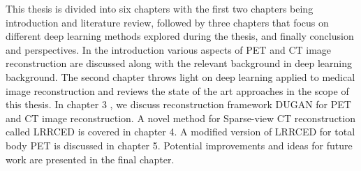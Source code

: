This thesis is divided into six chapters with the first two chapters being introduction and literature review, followed by three chapters that focus on different deep learning methods explored during the thesis, and finally conclusion and perspectives. In the introduction various aspects of \ac{PET} and \ac{CT} image reconstruction are discussed along with the relevant background in deep learning background. The second chapter throws light on deep learning applied to medical image reconstruction and reviews the state of the art approaches in the scope of this thesis. 
In chapter 3 , we discuss reconstruction framework \ac{DUGAN} for \ac{PET} and \ac{CT} image reconstruction. A novel method for Sparse-view \ac{CT} reconstruction called \ac{LRRCED} is covered in chapter 4. A modified version of \ac{LRRCED} for total body \ac{PET} is discussed in chapter 5. Potential improvements and ideas for future work are presented in the final chapter. 

